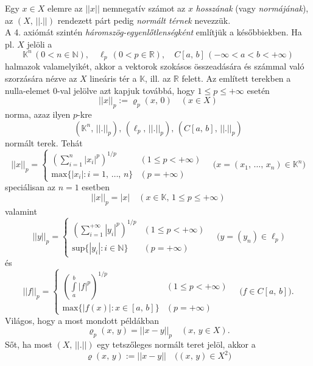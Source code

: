 \documentclass[12pt]{article}
\newcommand{\R}{\mathbb{R}}
\newcommand{\N}{\mathbb{N}}
\newcommand{\K}{\mathbb{K}}
\begin{document}
    Egy $x \in X$ elemre az $||x||$ nemnegatív számot az $x$ \textit{hosszának} (vagy \textit{normájának}), az $(X, \, ||.||)$ rendezett párt pedig \textit{normált térnek} nevezzük.\\

    A 4. axiómát szintén \textit{háromszög-egyenlőtlenségként} említjük a későbbiekben. Ha pl. $X$ jelöli a
    \[
        \K^n \, (0 < n \in \N), \quad \ell_p \, (0 < p \in \R), \quad C[a, \, b] \, (-\infty < a < b < + \infty)
    \]
    halmazok valamelyikét, akkor a vektorok szokásos összeadására és számmal való szorzására nézve az $X$ lineáris tér a $\K$, ill. az $\R$ felett. Az említett terekben a nulla-elemet 0-val jelölve azt kapjuk továbbá, hogy $1 \leq p \leq + \infty$ esetén
    \[
        ||x||_p := \varrho_p(x, \, 0) \quad (x \in X)
    \]
    norma, azaz ilyen $p$-kre
    \[
        (\K^n, \, ||.||_p), \, (\ell_p, \, ||.||_p), \, (C[a, \, b], \, ||.||_p)
    \]
    normált terek. Tehát
    \[
        ||x||_p =
        \begin{cases}
            \displaystyle \left( \sum_{i=1}^n |x_i|^p \right)^{1/p} & (1 \leq p < + \infty) \\
            \text{max}\{ |x_i| : i = 1, \, \dots, \, n\} & (p = + \infty)
        \end{cases}
        \quad \big( x = (x_1, \, \dots, \, x_n) \in \K^n \big)
    \]
    speciálisan az $n = 1$ esetben
    \[
        ||x||_p = |x| \quad (x \in \K, \, 1 \leq p \leq + \infty)
    \]
    valamint
    \[
        ||y||_p =
        \begin{cases}
            \displaystyle \left( \sum_{i=1}^{+\infty} |y_i|^p \right)^{1/p} & (1 \leq p < + \infty) \\
            \text{sup}\{ |y_i| : i \in \N \} & (p = + \infty) 
        \end{cases}
        \quad \big( y = (y_n) \in\ell_p \big)
    \]
    és
    \[
        ||f||_p =
        \begin{cases}
            \displaystyle \left( \int\limits_a^b |f|^p \right)^{1/p} & (1 \leq p < + \infty) \\
            \text{max} \{ |f(x)| : x \in [a,\, b] \} & (p = + \infty) 
        \end{cases}
        \quad \big( f \in C[a, \, b] \big).
    \]
    Világos, hogy a most mondott példákban
    \[
        \varrho_p(x,\, y) = ||x-y||_p \quad (x, \, y \in X).
    \]
    Sőt, ha most $(X, \, ||.||)$ egy tetszőleges normált teret jelöl, akkor a
    \[
        \varrho(x, \, y) := ||x-y|| \quad \big( (x, \, y) \in X^2 \big)
    \]
\end{document}
